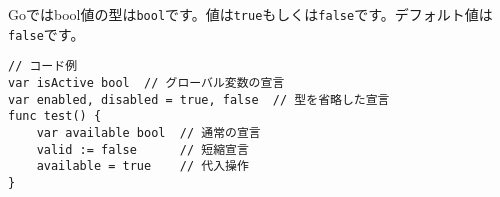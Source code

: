 Goではbool値の型は\texttt{bool}です。値は\texttt{true}もしくは\texttt{false}です。デフォルト値は\texttt{false}です。

\begin{lstlisting}[numbers=none]
// コード例
var isActive bool  // グローバル変数の宣言
var enabled, disabled = true, false  // 型を省略した宣言
func test() {
    var available bool  // 通常の宣言
    valid := false      // 短縮宣言
    available = true    // 代入操作
}
\end{lstlisting}
